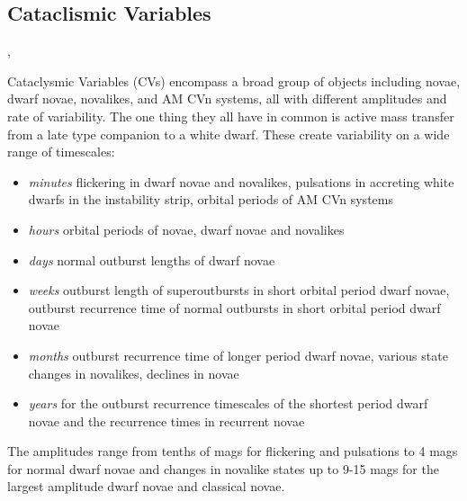 %
%
%
%

\subsection{Cataclismic Variables}
\def\secname{\chpname:CVtransients}\label{sec:\secname}

,

Cataclysmic Variables (CVs) encompass a broad group of objects
including novae, dwarf novae, novalikes, and AM CVn systems, all with different
amplitudes and rate of variability. The one thing they all have in
common is active mass transfer from a late type companion to a
white dwarf. These create variability on a wide range of timescales:

\begin{itemize}
	\item \textit{minutes} flickering in
dwarf novae and novalikes, pulsations in accreting white dwarfs in
the instability strip, orbital periods of AM CVn systems
\item \textit{hours} orbital periods of novae, dwarf novae and novalikes
\item \textit{days} normal outburst lengths of dwarf novae
\item \textit{weeks} outburst length of superoutbursts in short orbital period
dwarf novae, outburst recurrence time of normal outbursts in short
orbital period dwarf novae
\item \textit{months} outburst recurrence time of
longer period dwarf novae, various state changes in novalikes, declines
in novae
\item \textit{years} for the outburst recurrence timescales of the
shortest period dwarf novae and the recurrence times in recurrent novae
\end{itemize}
The
amplitudes range from tenths of mags for flickering and pulsations to 4 mags
for normal dwarf novae and changes in novalike states up to 9-15 mags for the
largest amplitude dwarf novae and classical novae.


